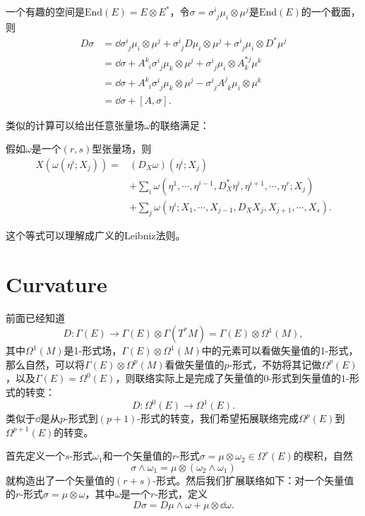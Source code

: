 一个有趣的空间是$\mathrm{End}(E)=E\otimes E^*$，令$\sigma=\sigma^{i}_{\phantom{i}j}\mu_i\otimes \mu^j$是$\mathrm{End}(E)$的一个截面，则
\begin{align*}
	D\sigma&=\dd \sigma^{i}_{\phantom{i}j} \mu_i\otimes \mu^j+\sigma^{i}_{\phantom{i}j}D\mu_i\otimes \mu^j+\sigma^{i}_{\phantom{i}j}\mu_i\otimes D^*\mu^j\\
	&=\dd \sigma+A_{\phantom{k}i}^{k}\sigma^{i}_{\phantom{i}j}\mu_k\otimes \mu^j+\sigma^{i}_{\phantom{i}j}\mu_i\otimes A_{k}^{*j}\mu^k\\
	&=\dd \sigma+A_{\phantom{k}i}^{k}\sigma^{i}_{\phantom{i}j}\mu_k\otimes \mu^j-\sigma^{i}_{\phantom{i}j}A_{\phantom{j}k}^{j}\mu_i\otimes\mu^k\\
	&=\dd \sigma+[A,\sigma].
\end{align*}

类似的计算可以给出任意张量场$\omega$的联络满足：

\pro 假如$\omega$是一个$(r,s)$型张量场，则
\begin{align*}
	X(\omega(\eta^i;X_j))=&(D_X\omega)(\eta^i;X_j)\\
	&+\sum_i \omega\left(\eta^{1},\cdots,\eta^{i-1},D^*_X \eta^i,\eta^{i+1},\cdots,\eta^r;X_j\right)\\
	&+\sum_j \omega\left(\eta^i;X_{1},\cdots,X_{j-1},D_X X_j,X_{j+1},\cdots,X_s\right).
\end{align*}

这个等式可以理解成广义的Leibniz法则。
\section{Curvature}
前面已经知道
\[
	D:\Gamma (E)\to\Gamma(E)\otimes \Gamma(T^*M)=\Gamma(E)\otimes \Omega^1(M),
\]
其中$\Omega^1(M)$是1-形式场，$\Gamma(E)\otimes \Omega^1(M)$中的元素可以看做矢量值的1-形式，那么自然，可以将$\Gamma(E)\otimes \Omega^p(M)$看做矢量值的$p$-形式，不妨将其记做$\Omega^p(E)$，以及$\Gamma (E)=\Omega^0 (E)$，则联络实际上是完成了矢量值的$0$-形式到矢量值的$1$-形式的转变：
\[
	D:\Omega^0 (E)\to \Omega^1(E).
\]
类似于$\dd$是从$p$-形式到$(p+1)$-形式的转变，我们希望拓展联络完成$\Omega^p (E)$到$\Omega^{p+1}(E)$的转变。

首先定义一个$s$-形式$\omega_1$和一个矢量值的$r$-形式$\sigma=\mu\otimes\omega_2\in \Omega^r (E)$的楔积，自然
\[
	\sigma\wedge \omega_1=\mu\otimes(\omega_2\wedge \omega_1)
\]
就构造出了一个矢量值的$(r+s)$-形式。然后我们扩展联络如下：对一个矢量值的$r$-形式$\sigma=\mu \otimes \omega$，其中$\omega$是一个$r$-形式，定义
\[
	D\sigma=D\mu \wedge\omega+\mu\otimes \dd \omega.
\]


